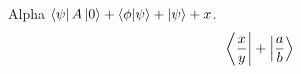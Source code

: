 \documentclass[11pt,aspectratio=169]{beamer}
\begin{document}
\begin{frame}{Alpha}
$\bra{\psi}A\ket0 + \braket{\phi|\psi} + \ket\psi + x$.
\[ \Bra{\frac{x}{y}} + \Ket{\frac{a}{b}} \]
\end{frame}
\end{document}
